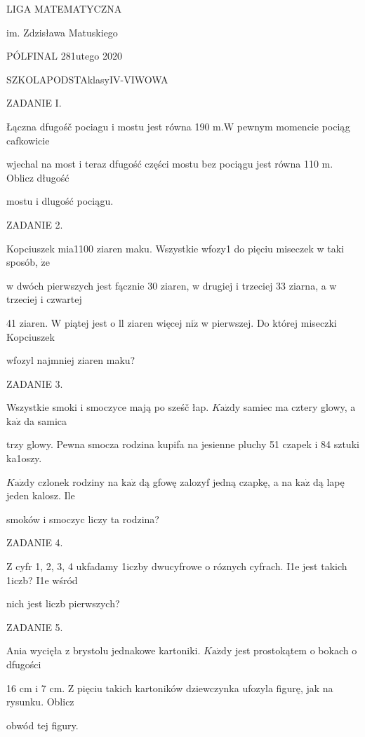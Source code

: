 \documentclass[a4paper,12pt]{article}
\begin{document}
LIGA MATEMATYCZNA

im. Zdzisława Matuskiego

PÓLFINAL 281utego 2020

SZKOLAPODSTAklasyIV-VIWOWA

ZADANIE I.

Łączna dfugośč pociagu i mostu jest równa 190 $\mathrm{m}. \mathrm{W}$ pewnym momencie pociąg cafkowicie

wjechal na most i teraz dfugość części mostu bez pociągu jest równa 110 $\mathrm{m}$. Oblicz długość

mostu i dlugość pociągu.

ZADANIE 2.

Kopciuszek mia1100 ziaren maku. Wszystkie wfozy1 do pięciu miseczek w taki sposób, $\dot{\mathrm{z}}\mathrm{e}$

w dwóch pierwszych jest fącznie 30 ziaren, w drugiej i trzeciej 33 ziarna, a w trzeciej i czwartej

41 ziaren. $\mathrm{W}$ piątej jest o ll ziaren więcej $\mathrm{n}\mathrm{i}\dot{\mathrm{z}}$ w pierwszej. Do której miseczki Kopciuszek

wfozyl najmniej ziaren maku?

ZADANIE 3.

Wszystkie smoki i smoczyce mają po sześč łap. $K\mathrm{a}\dot{\mathrm{z}}\mathrm{d}\mathrm{y}$ samiec ma cztery glowy, a $\mathrm{k}\mathrm{a}\dot{\mathrm{z}}$ da samica

trzy glowy. Pewna smocza rodzina kupifa na jesienne pluchy 51 czapek i 84 sztuki ka1oszy.

$K\mathrm{a}\dot{\mathrm{z}}\mathrm{d}\mathrm{y}$ czlonek rodziny na $\mathrm{k}\mathrm{a}\dot{\mathrm{z}}$ dą gfowę zalozyf jedną czapkę, a na $\mathrm{k}\mathrm{a}\dot{\mathrm{z}}$ dą lapę jeden kalosz. Ile

smoków i smoczyc liczy ta rodzina?

ZADANIE 4.

$\mathrm{Z}$ cyfr 1, 2, 3, 4 ukfadamy 1iczby dwucyfrowe o róznych cyfrach. I1e jest takich 1iczb? I1e wśród

nich jest liczb pierwszych?

ZADANIE 5.

Ania wycięła z brystolu jednakowe kartoniki. $K\mathrm{a}\dot{\mathrm{z}}\mathrm{d}\mathrm{y}$ jest prostokątem o bokach o dfugości

16 cm i 7 cm. $\mathrm{Z}$ pięciu takich kartoników dziewczynka ufozyla figurę, jak na rysunku. Oblicz

obwód tej figury.
\end{document}
